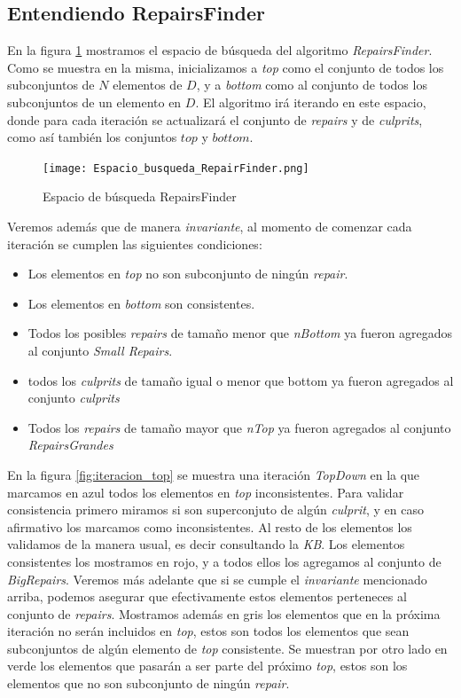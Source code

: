 \documentclass[11pt,a4paper,twoside]{tesis}
\begin{document}
\subsection{Entendiendo RepairsFinder}

En la figura \ref{fig:espacio_busqueda_repair_finder} mostramos el espacio de búsqueda del algoritmo \textit{RepairsFinder}. Como se muestra en la misma, inicializamos a \textit{top} como el conjunto de todos los subconjuntos de $N$ elementos de $D$, y a \textit{bottom} como al conjunto de todos los subconjuntos de un elemento en $D$. El algoritmo irá iterando en este espacio, donde para cada iteración se actualizará el conjunto de \textit{repairs} y de \textit{culprits}, como así también los conjuntos $top$ y $bottom$. 



\begin{figure}[ht]
    \texttt{[image: Espacio\_busqueda\_RepairFinder.png]}
    \centering
    \caption{Espacio de búsqueda RepairsFinder}
    \label{fig:espacio_busqueda_repair_finder}
\end{figure}

Veremos además que de manera \textit{invariante}, al momento de comenzar cada iteración se cumplen las siguientes condiciones:

\begin{itemize}
    \item Los elementos en \textit{top} no son subconjunto de ningún \textit{repair}.
    \item Los elementos en \textit{bottom} son consistentes.
    \item Todos los posibles \textit{repairs} de tamaño menor que \textit{nBottom} ya fueron agregados al conjunto \textit{Small Repairs}.
    \item todos los \textit{culprits} de tamaño igual o menor que bottom ya fueron agregados al conjunto \textit{culprits}
    \item Todos los \textit{repairs} de tamaño mayor que \textit{nTop} ya fueron agregados al conjunto \textit{RepairsGrandes}
\end{itemize}

En la figura \ref{fig:iteracion_top} se muestra una iteración \textit{TopDown} en la que marcamos en azul todos los elementos en \textit{top} inconsistentes. Para validar consistencia primero miramos si son superconjuto de algún \textit{culprit}, y en caso afirmativo los marcamos como inconsistentes. Al resto de los elementos los validamos de la manera usual, es decir consultando la \textit{KB}. Los elementos consistentes los mostramos en rojo, y a todos ellos los agregamos al conjunto de \textit{BigRepairs}. Veremos más adelante que si se cumple el \textit{invariante} mencionado arriba, podemos asegurar que efectivamente estos elementos perteneces al conjunto de \textit{repairs}. Mostramos además en gris los elementos que en la próxima iteración no serán incluidos en \textit{top}, estos son todos los elementos que sean subconjuntos de algún elemento de \textit{top} consistente. Se muestran por otro lado en verde los elementos que pasarán a ser parte del próximo \textit{top}, estos son los elementos que no son subconjunto de ningún \textit{repair}.
\end{document}

